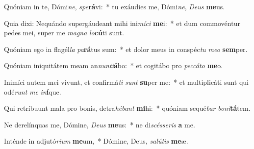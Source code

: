 \item Quóniam in te, Dómi\textit{ne}, \textit{spe}\textbf{rá}vi:~* tu exáudies me, Dómi\textit{ne}, \textit{De}\textit{us} \textbf{me}us.
\item Quia dixi: Nequándo supergáudeant mihi ini\textit{mí}\textit{ci} \textbf{me}i:~* et dum commovéntur pedes mei, super me \textit{ma}\textit{gna} \textit{lo}\textbf{cú}ti sunt.
\item Quóniam ego in flagél\textit{la} \textit{pa}\textbf{rá}tus sum:~* et dolor meus in conspéc\textit{tu} \textit{me}\textit{o} \textbf{sem}per.
\item Quóniam iniquitátem meam an\textit{nun}\textit{ti}\textbf{á}bo:~* et cogitábo pro \textit{pec}\textit{cá}\textit{to} \textbf{me}o.
\item Inimíci autem mei vivunt, et confirmá\textit{ti} \textit{sunt} \textbf{su}per me:~* et multiplicáti sunt qui odé\textit{runt} \textit{me} \textit{in}\textbf{í}que.
\item Qui retríbuunt mala pro bonis, detra\textit{hé}\textit{bant} \textbf{mi}hi:~* quóniam sequé\textit{bar} \textit{bo}\textit{ni}\textbf{tá}tem.
\item Ne derelínquas me, Dómine, \textit{De}\textit{us} \textbf{me}us:~* ne di\textit{scés}\textit{se}\textit{ris} \textbf{a} me.
\item Inténde in adjutó\textit{ri}\textit{um} \textbf{me}um,~* Dómine, Deus, \textit{sa}\textit{lú}\textit{tis} \textbf{me}æ.
